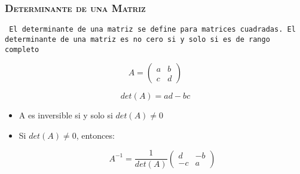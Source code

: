 \documentclass[16.5pt]{beamer}
\begin{document}
{
\begin{frame}
\frametitle{\textsc{\textbf{Determinante de una Matriz}}}
\hspace*{-5mm}
\vspace*{-5mm} 
\vspace{0.3cm}



\texttt{  {\color{blue} El determinante de una matriz se define para matrices cuadradas. El determinante de una matriz es no cero si y solo si es de rango completo}}


$$ A= \begin{pmatrix} a & b \\ c & d \end{pmatrix}$$

$$det(A) = ad-bc$$

\begin{itemize}
\item A es inversible si y solo si $det(A) \neq 0$
\item Si $det(A) \neq  0$, entonces:

$$ A^{-1} = \frac{1}{det(A)}\begin{pmatrix} d & -b \\ -c & a   \end{pmatrix}$$

\end{itemize}

\end{frame}
}
\end{document}
